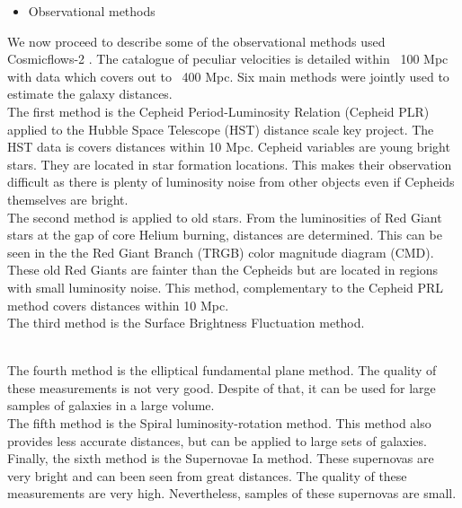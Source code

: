 \documentclass[12pt]{article}
\begin{document}
\begin{itemize}
\item Observational methods
\end{itemize}
\begin{par}
We now proceed to describe some of the observational
 methods used Cosmicflows-2
  \cite{tully_cosmicflows-2_2013}. The catalogue of
   peculiar velocities is detailed within ~100 Mpc with
    data which covers out to ~400 Mpc. Six main methods
     were jointly used to estimate the galaxy
      distances.	\\
     
     The first method is the Cepheid Period-Luminosity
      Relation (Cepheid PLR) applied to the Hubble
       Space Telescope (HST) distance scale key
        project. The HST data is covers distances
         within 10 Mpc. Cepheid variables are young
          bright stars. They are located in star
           formation locations. 
           This makes their observation
            difficult as there is plenty of luminosity
             noise from other objects even if Cepheids
              themselves are bright.\\

The second method is applied to old stars. From the
 luminosities of Red Giant stars at the gap of core
  Helium burning, distances are determined. This can be
   seen in the the Red Giant Branch (TRGB) color
    magnitude diagram (CMD). These old Red Giants are
     fainter than the Cepheids but are located in
      regions with small luminosity noise. This method,
       complementary to the Cepheid PRL method covers
        distances within 10 Mpc.\\
        
The third method is the Surface Brightness Fluctuation method.\\\

The fourth method is the elliptical fundamental plane
 method. The quality of these measurements is not very
  good. Despite of that, it can be used for large
   samples of galaxies in a large volume.\\

The fifth method is the Spiral luminosity-rotation
 method. This method also provides less accurate
  distances, but can be applied to large sets of
   galaxies.\\

Finally, the sixth method is the Supernovae Ia method.
These supernovas are very bright and can been seen from
 great distances. The quality of these measurements are
  very high. Nevertheless, samples of these supernovas
   are small.
\end{par}
\end{document}
